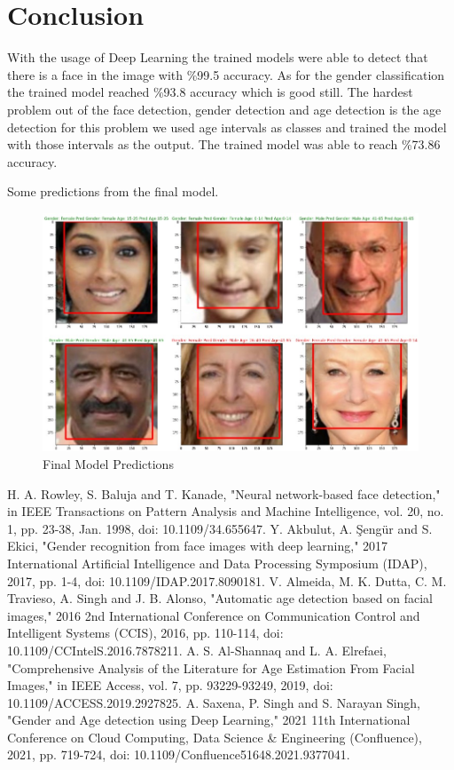 \documentclass[conference]{IEEEtran}
\begin{document}
\bigskip

\section{Conclusion}

With the usage of Deep Learning the trained models were able to detect that there is a face in the image with \%99.5 accuracy. As for the gender classification the trained model reached \%93.8 accuracy which is good still. The hardest problem out of the face detection, gender detection and age detection is the age detection for this problem we used age intervals as classes and trained the model with those intervals as the output. The trained model was able to reach \%73.86 accuracy.

\bigskip
Some predictions from the final model.

\begin{figure}[htbp]
\centering
\includegraphics[scale=0.33]{finalmodel.jpg}
\caption{Final Model Predictions}
\label{fig:finalmodel}
\end{figure}


\bigskip

\begin{thebibliography}{00}
 H. A. Rowley, S. Baluja and T. Kanade, "Neural network-based face detection," in IEEE Transactions on Pattern Analysis and Machine Intelligence, vol. 20, no. 1, pp. 23-38, Jan. 1998, doi: 10.1109/34.655647.
 Y. Akbulut, A. Şengür and S. Ekici, "Gender recognition from face images with deep learning," 2017 International Artificial Intelligence and Data Processing Symposium (IDAP), 2017, pp. 1-4, doi: 10.1109/IDAP.2017.8090181.
 V. Almeida, M. K. Dutta, C. M. Travieso, A. Singh and J. B. Alonso, "Automatic age detection based on facial images," 2016 2nd International Conference on Communication Control and Intelligent Systems (CCIS), 2016, pp. 110-114, doi: 10.1109/CCIntelS.2016.7878211.
 A. S. Al-Shannaq and L. A. Elrefaei, "Comprehensive Analysis of the Literature for Age Estimation From Facial Images," in IEEE Access, vol. 7, pp. 93229-93249, 2019, doi: 10.1109/ACCESS.2019.2927825.
 A. Saxena, P. Singh and S. Narayan Singh, "Gender and Age detection using Deep Learning," 2021 11th International Conference on Cloud Computing, Data Science \& Engineering (Confluence), 2021, pp. 719-724, doi: 10.1109/Confluence51648.2021.9377041.
\end{thebibliography}
\end{document}
